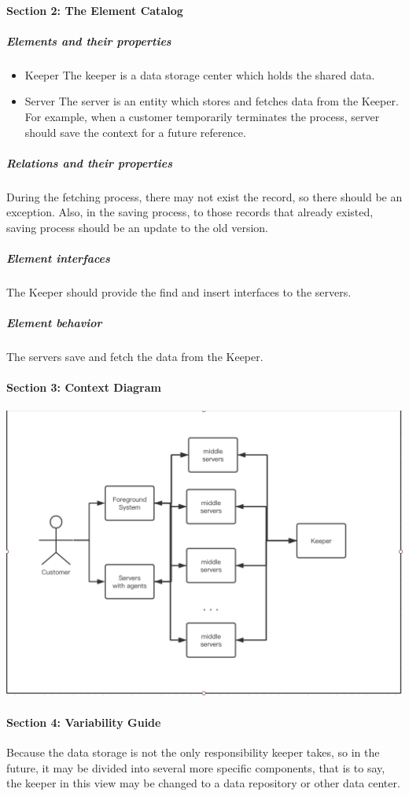 \documentclass{article}
\begin{document}
			\paragraph{Section 2: The Element Catalog}
			\subparagraph{Elements and their properties}
			\begin{itemize}
			\item{Keeper} The keeper is a data storage center which holds the shared data.
			\item{Server} The server is an entity which stores and fetches data from the Keeper. For example, when a customer temporarily terminates the process, server should save the context for a future reference.
			\end{itemize}
			\subparagraph{Relations and their properties}
			During the fetching process, there may not exist the record, so there should be an exception. Also, in the saving process, to those records that already existed, saving process should be an update to the old version.
			\subparagraph{Element interfaces}
			The Keeper should provide the find and insert interfaces to the servers.
			\subparagraph{Element behavior}
			The servers save and fetch the data from the Keeper.
			\paragraph{Section 3: Context Diagram}
			\begin{center}
			\includegraphics[scale=0.3]{share2.png}
			\end{center}
			\paragraph{Section 4: Variability Guide}
			Because the data storage is not the only responsibility keeper takes, so in the future, it may be  divided into several more specific components, that is to say, the keeper in this view may be changed to a data repository or other data center.
\end{document}
